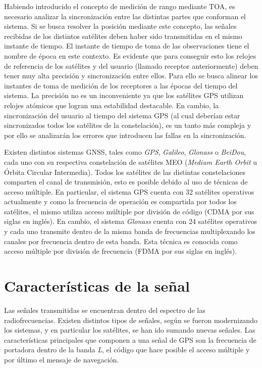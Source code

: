 \documentclass[a4paper,12pt,oneside,onecolumn,final,openright]{book}%
\begin{document}
	Habiendo introducido el concepto de medición de rango mediante TOA, es necesario analizar la sincronización entre las distintas partes que conforman el sistema. Si se busca resolver la posición mediante este concepto, las señales recibidas de los distintos satélites deben haber sido transmitidas en el mismo instante de tiempo. El instante de tiempo de toma de las observaciones tiene el nombre de época en este contexto. Es evidente que para conseguir esto los relojes de referencia de los satélites y del usuario (llamado receptor anteriormente) deben tener muy alta precisión y sincronización entre ellos. Para ello se busca alinear los instantes de toma de medición de los receptores a las épocas del tiempo del sistema. La precisión no es un inconveniente ya que los satélites GPS utilizan relojes atómicos que logran una estabilidad destacable. En cambio, la sincronización del usuario al tiempo del sistema GPS (al cual deberían estar sincronizados todos los satélites de la constelación), es un tanto más compleja y por ello se analizarán los errores que introducen las fallas en la sincronización.
	
	Existen distintos sistemas GNSS, tales como \textit{GPS}, \textit{Galileo}, \textit{Glonass} o \textit{BeiDou}, cada uno con su respectiva constelación de satélites MEO (\textit{Medium Earth Orbit} u Órbita Circular Intermedia). Todos los satélites de las distintas constelaciones comparten el canal de transmisión, esto es posible debido al uso de técnicas de acceso múltiple. En particular, el sistema GPS cuenta con 32 satélites operativos actualmente y como la frecuencia de operación es compartida por todos los satélites, el mismo utiliza acceso múltiple por división de código (CDMA por sus siglas en inglés). En cambio, el sistema \textit{Glonass} cuenta con 24 satélites operativos y cada uno transmite dentro de la misma banda de frecuencias multiplexando los canales por frecuencia dentro de esta banda. Esta técnica es conocida como acceso múltiple por división de frecuencia (FDMA por sus siglas en inglés).
	
\section{Características de la señal}\label{sec:senial}
	Las señales transmitidas se encuentran dentro del espectro de las radiofrecuencias. Existen distintos tipos de señales, según se fueron modernizando los sistemas, y en particular los satélites, se han ido sumando nuevas señales. Las características principales que componen a una señal de GPS son la frecuencia de portadora dentro de la banda \textit{L}, el código que hace posible el acceso múltiple y por último el mensaje de navegación.
	
\end{document}
